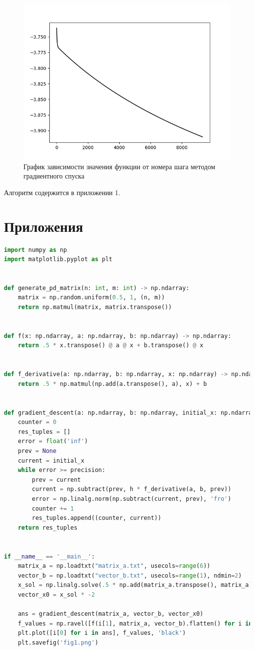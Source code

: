 \documentclass[a4paper, 14pt]{extarticle}
\begin{document}
 	\begin{figure}[H]
 		\centering
 		\includegraphics[width = \linewidth]{fig1.png}
 		\caption[.] {График зависимости значения функции от номера шага методом градиентного спуска }
 	\end{figure}
 	Алгоритм содержится в приложении 1.
 	
 	\section{Приложения}
 	\begin{lstlisting}[language=python]
import numpy as np
import matplotlib.pyplot as plt


def generate_pd_matrix(n: int, m: int) -> np.ndarray:
	matrix = np.random.uniform(0.5, 1, (n, m))
	return np.matmul(matrix, matrix.transpose())


def f(x: np.ndarray, a: np.ndarray, b: np.ndarray) -> np.ndarray:
	return .5 * x.transpose() @ a @ x + b.transpose() @ x


def f_derivative(a: np.ndarray, b: np.ndarray, x: np.ndarray) -> np.ndarray:
	return .5 * np.matmul(np.add(a.transpose(), a), x) + b


def gradient_descent(a: np.ndarray, b: np.ndarray, initial_x: np.ndarray, h=10e-4, precision=10e-5):
	counter = 0
	res_tuples = []
	error = float('inf')
	prev = None
	current = initial_x
	while error >= precision:
		prev = current
		current = np.subtract(prev, h * f_derivative(a, b, prev))
		error = np.linalg.norm(np.subtract(current, prev), 'fro')
		counter += 1
		res_tuples.append((counter, current))
	return res_tuples


if __name__ == '__main__':
	matrix_a = np.loadtxt("matrix_a.txt", usecols=range(6))
	vector_b = np.loadtxt("vector_b.txt", usecols=range(1), ndmin=2)
	x_sol = np.linalg.solve(.5 * np.add(matrix_a.transpose(), matrix_a), -vector_b)
	vector_x0 = x_sol * -2
	
	ans = gradient_descent(matrix_a, vector_b, vector_x0)
	f_values = np.ravel([f(i[1], matrix_a, vector_b).flatten() for i in ans]).tolist()
	plt.plot([i[0] for i in ans], f_values, 'black')
	plt.savefig('fig1.png')	
 	\end{lstlisting}
		  
\end{document}
